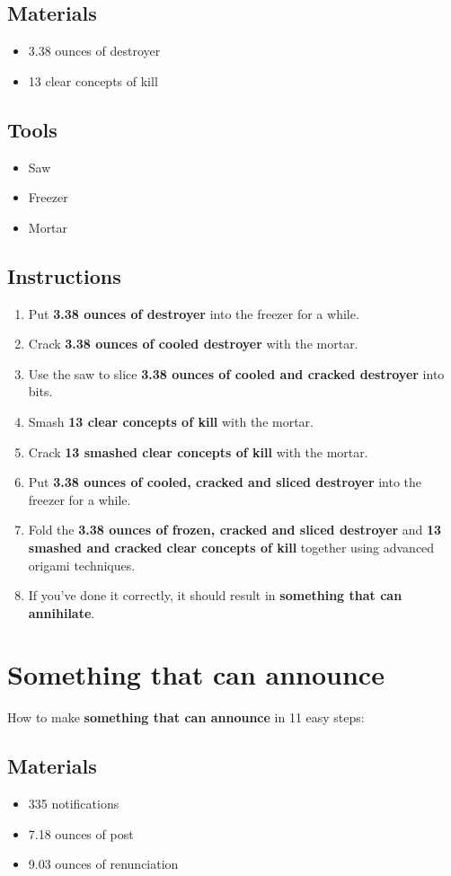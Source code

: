 \documentclass{article}
\begin{document}
\subsection{Materials}\begin{itemize}
\item 
3.38 ounces of destroyer
\item 
13 clear concepts of kill
\end{itemize}
\subsection{Tools}\begin{itemize}
\item 
Saw
\item 
Freezer
\item 
Mortar
\end{itemize}
\subsection{Instructions}\begin{enumerate}
\item 
Put \textbf{3.38 ounces of destroyer} into the freezer for a while.
\item 
Crack \textbf{3.38 ounces of cooled destroyer} with the mortar.
\item 
Use the saw to slice \textbf{3.38 ounces of cooled and cracked destroyer} into bits.
\item 
Smash \textbf{13 clear concepts of kill} with the mortar.
\item 
Crack \textbf{13 smashed clear concepts of kill} with the mortar.
\item 
Put \textbf{3.38 ounces of cooled, cracked and sliced destroyer} into the freezer for a while.
\item 
Fold the \textbf{3.38 ounces of frozen, cracked and sliced destroyer} and \textbf{13 smashed and cracked clear concepts of kill} together using advanced origami techniques.
\item 
If you've done it correctly, it should result in \textbf{something that can annihilate}.
\end{enumerate}
\newpage
\section{Something that can announce}How to make \textbf{something that can announce} in 11 easy steps:

\subsection{Materials}\begin{itemize}
\item 
335 notifications
\item 
7.18 ounces of post
\item 
9.03 ounces of renunciation
\end{itemize}
\end{document}
